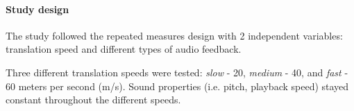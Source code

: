 \paragraph{Study design}
The study followed the repeated measures design with 2 independent variables: translation speed and different types of audio feedback.

Three different translation speeds were tested: \textit{slow} - 20, \textit{medium }- 40, and \textit{fast }- 60 meters per second (m/s). Sound properties (i.e. pitch, playback speed) stayed constant throughout the different speeds.

